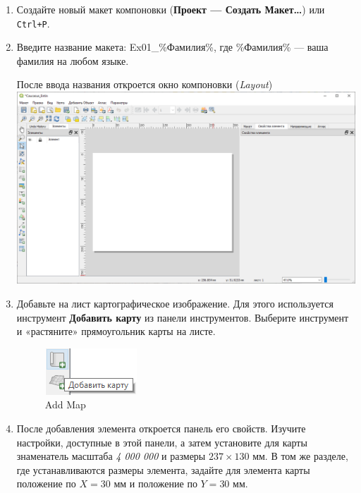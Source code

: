 \documentclass[
  12pt,
]{book}
\begin{document}
\begin{enumerate}
\def\labelenumi{\arabic{enumi}.}
\item
  Создайте новый макет компоновки (\textbf{Проект --- Создать Макет\ldots{}}) или \texttt{Ctrl+P}.
\item
  Введите название макета: Ex01\_\%Фамилия\%, где \%Фамилия\% --- ваша фамилия на любом языке.

  После ввода названия откроется окно компоновки (\emph{Layout})\\
  \includegraphics{images/Ex01/Layout.png}
\item
  Добавьте на лист картографическое изображение. Для этого используется инструмент \textbf{Добавить карту} из панели инструментов. Выберите инструмент и «растяните» прямоугольник карты на листе.

  \begin{figure}
  \centering
  \includegraphics{images/Ex01/button_AddMap.png}
  \caption{Add Map}
  \end{figure}
\item
  После добавления элемента откроется панель его свойств. Изучите настройки, доступные в этой панели, а затем установите для карты знаменатель масштаба \emph{4 000 000} и размеры \(237\times130\) мм. В том же разделе, где устанавливаются размеры элемента, задайте для элемента карты положение по \(X = 30\) мм и положение по \(Y = 30\) мм.


\end{enumerate}
\end{document}
